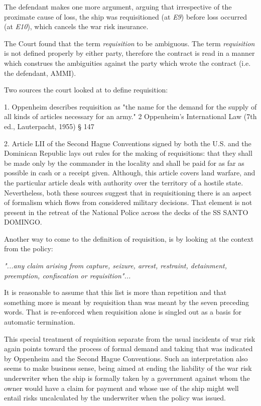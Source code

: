     The defendant makes one more argument, arguing that irrespective of the proximate cause of loss, the ship was requisitioned (at \textit{E9}) before loss occurred (at \textit{E10}), which cancels the war risk insurance.
            
    The Court found that the term \textit{requisition} to be ambiguous. The term \textit{requisition} is not defined properly by either party, therefore the contract is read in a manner which construes the ambiguities against the party which wrote the contract (i.e. the defendant, AMMI). 
    
    Two sources the court looked at to define requisition:
    
    1. Oppenheim describes requisition as "the name for the demand for the supply of all kinds of articles necessary for an army." 2 Oppenheim's International Law (7th ed., Lauterpacht, 1955) § 147
    
    2. Article LII of the Second Hague Conventions signed by both the U.S. and the Dominican Republic lays out rules for the making of requisitions: that they shall be made only by the commander in the locality and shall be paid for as far as possible in cash or a receipt given. Although, this article covers land warfare, and the particular article deals with authority over the territory of a hostile state. Nevertheless, both these sources suggest that in requisitioning there is an aspect of formalism which flows from considered military decisions. That element is not present in the retreat of the National Police across the decks of the SS SANTO DOMINGO.
     
     Another way to come to the definition of requisition, is by looking at the context from the policy:
     
     \textit{ "...any claim arising from capture, seizure, arrest, restraint, detainment, preemption, confiscation or requisition"...}
     
     It is reasonable to assume that this list is more than repetition and that something more is meant by requisition than was meant by the seven preceding words. That is re-enforced when requisition alone is singled out as a basis for automatic termination.
     
     This special treatment of requisition separate from the usual incidents of war risk again points toward the process of formal demand and taking that was indicated by Oppenheim and the Second Hague Conventions. Such an interpretation also seems to make business sense, being aimed at ending the liability of the war risk underwriter when the ship is formally taken by a government against whom the owner would have a claim for payment and whose use of the ship might well entail risks uncalculated by the underwriter when the policy was issued.
     
